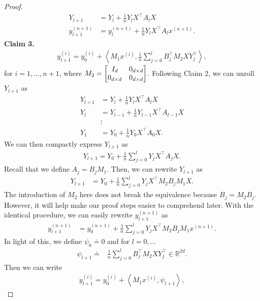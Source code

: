 \documentclass{article}
\newcommand{\R}{\mathbb{R}}
\newcommand{\indot}[2]{{\left<#1, #2\right>}}
\begin{document}
\begin{proof}
    \begin{align}
        Y_{l+1} &= Y_l + \frac{1}{n} Y_l X^\top A_l X\\
        y_{l+1}^{(n+1)} &= y_l^{(n+1)} + \frac{1}{n} Y_l X^\top A_l x^{(n+1)}.
    \end{align}
    \textbf{Claim 3.}
    \begin{align}
      y_{l+1}^{(i)} = y_0^{(i)} + \indot{M_1 x^{(i)}}{\frac{1}{n}\sum_{j=0}^l B_j^\top M_2 X Y_j^\top},
    \end{align}
    for $i = 1, \dots, n+1$, where $M_2 = \mqty[I_{d} & 0_{d\times d}\\ 0_{d\times d} & 0_{d\times d}]$.
    Following Claim 2, we can unroll $Y_{l+1}$ as
    \begin{align}
        Y_{l+1} &= Y_l + \frac{1}{n} Y_l X^\top A_l X\\
        Y_l &= Y_{l-1} + \frac{1}{n} Y_{l-1} X^\top A_{l-1} X\\
         &\vdots\\
        Y_1 & = Y_0 + \frac{1}{n} Y_0 X^\top A_0 X.
    \end{align}
    We can then compactly express $Y_{l+1}$ as
    \begin{align}
        Y_{l+1} = Y_0 + \frac{1}{n}\sum_{j=0}^l Y_j X^\top A_j X.
    \end{align}
    Recall that we define $A_j = B_j M_1$.
    Then, we can rewrite $Y_{l+1}$ as
    \begin{align}
        Y_{l+1}
        &= Y_0 + \frac{1}{n} \sum_{j=0}^l Y_j X^\top M_2 B_j M_1 X.
    \end{align}
    The introduction of $M_2$ here does not break the equivalence because $B_j = M_2 B_j$.
    However, it will help make our proof steps easier to comprehend later.
    With the identical procedure, we can easily rewrite $y_{l+1}^{(n+1)}$ as
    \begin{align}
        y_{l+1}^{(n+1)} &= y_0^{(n+1)} + \frac{1}{n} \sum_{j=0}^l Y_j X^\top M_2 B_j M_1 x^{(n+1)}.
    \end{align}
    In light of this,
    we define $\psi_0 \doteq 0$ and for $l = 0, \dots$
    \begin{align}
      \psi_{l+1} \doteq& \frac{1}{n}\sum_{j=0}^l B_j^\top M_2 X Y_j^\top \in \R^{2d}. \label{eq: theta_l define}
    \end{align}
    Then we can write
    \begin{align}
        y_{l+1}^{(i)} = y_0^{(i)} + \indot{M_1 x^{(i)}}{\psi_{l+1}}, \label{eq: y_l+1 evol theta}
    \end{align}

\end{proof}
\end{document}
